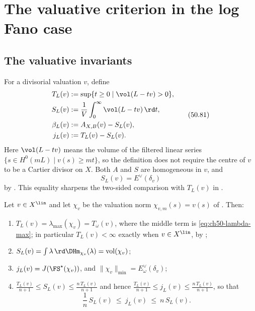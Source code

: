 \section{The valuative criterion in the log Fano case}
\label{sec:ch50-valuative}

\subsection{The valuative invariants}
\label{sec:ch50-valuative-invariants}

For a divisorial valuation $v$, define
\[
 \begin{split}
 T_L(v)&:=\sup\{t\geq0\mid\vol(L-tv)>0\},\\
 S_L(v)&:=\frac1V\int_0^\infty\vol(L-tv)\,\rd t,\\
 \beta_L(v)&:=A_{X,B}(v)-S_L(v),\\
 j_L(v)&:=T_L(v)-S_L(v).
 \end{split}
\tag{50.81}\label{eq:stability-valuative-invariants}
\]
Here $\vol(L-tv)$ means the volume of the filtered linear series
$\{s\in H^0(mL)\mid v(s)\geq mt\}$, so the definition does not require
the centre of $v$ to be a Cartier divisor on $X$.  Both $A$ and $S$
are homogeneous in $v$, and
\[
                       S_L(v)=E^\vee(\delta_v)
\]
by \cite[Theorem~7.22(iii)]{BJKS1}.  This equality sharpens the
two-sided comparison with $T_L(v)$ in
.

\begin{proposition}
\label{prop:ch50-valuative-dh}
Let $v\in X^{\lin}$ and let $\chi_v$ be the valuation norm
$\chi_{v,m}(s)=v(s)$ of .  Then:
\begin{enumerate}
\item\label{itm:ch50-vdh:T}
      $T_L(v)=\lambda_{\max}(\chi_v)=T_\omega(v)$, where the middle term
      is \eqref{eq:ch50-lambda-max}; in particular
      $T_L(v)<\infty$ exactly when $v\in X^{\lin}$, by
      ;
\item\label{itm:ch50-vdh:S}
      $S_L(v)=\int\lambda\,\rd\DHm_{\chi_v}(\lambda)
      =\operatorname{vol}(\chi_v)$;
\item\label{itm:ch50-vdh:j}
      $j_L(v)=J(\FS^\star(\chi_v))$, and
      $\|\chi_v\|_{\min}=E^\vee_\omega(\delta_v)$;
\item\label{itm:ch50-vdh:comparison}
      $\displaystyle\frac{T_L(v)}{n+1}\le S_L(v)\le\frac{n\,T_L(v)}{n+1}$
      and hence
      $\displaystyle\frac{T_L(v)}{n+1}\le j_L(v)\le\frac{n\,T_L(v)}{n+1}$,
      so that
      \[
       \frac1n\,S_L(v)\ \le\ j_L(v)\ \le\ n\,S_L(v).
      \tag{50.82}\label{eq:ch50-j-vs-S}
      \]
\end{enumerate}
\end{proposition}

